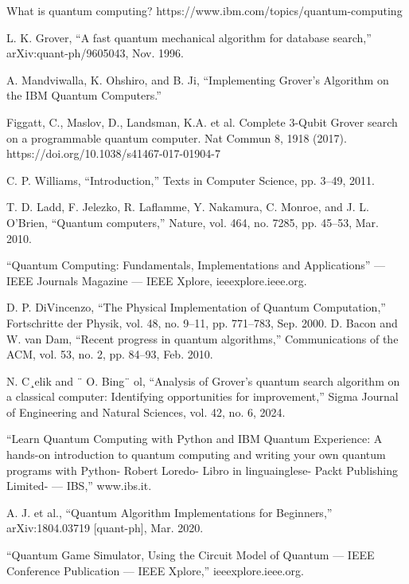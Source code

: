 \documentclass[conference]{IEEEtran}
\begin{document}
\begin{thebibliography}{00}
	 What is quantum computing?  https://www.ibm.com/topics/quantum-computing

	  L. K. Grover, “A fast quantum mechanical algorithm for database search,” arXiv:quant-ph/9605043, Nov. 1996.

	 A. Mandviwalla, K. Ohshiro, and B. Ji, “Implementing Grover’s Algorithm on the IBM Quantum Computers.”

	 Figgatt, C., Maslov, D., Landsman, K.A. et al. Complete 3-Qubit Grover search on a programmable quantum computer. Nat Commun 8, 1918 (2017). https://doi.org/10.1038/s41467-017-01904-7

	  C. P. Williams, “Introduction,” Texts in Computer Science, pp. 3–49,
	2011.

	  T. D. Ladd, F. Jelezko, R. Laflamme, Y. Nakamura, C. Monroe, and
	J. L. O’Brien, “Quantum computers,” Nature, vol. 464, no. 7285, pp.
	45–53, Mar. 2010.

	 “Quantum Computing: Fundamentals, Implementations and Applications” — IEEE Journals Magazine — IEEE Xplore, ieeexplore.ieee.org.

	 D. P. DiVincenzo, “The Physical Implementation of Quantum Computation,” Fortschritte der Physik, vol. 48, no. 9–11, pp. 771–783, Sep.
	2000.
	  D. Bacon and W. van Dam, “Recent progress in quantum algorithms,”
	Communications of the ACM, vol. 53, no. 2, pp. 84–93, Feb. 2010.

	  N. C¸elik and ¨ O. Bing¨ ol, “Analysis of Grover’s quantum search algorithm
	on a classical computer: Identifying opportunities for improvement,”
	Sigma Journal of Engineering and Natural Sciences, vol. 42, no. 6, 2024.

	 “Learn Quantum Computing with Python and IBM Quantum Experience: A hands-on introduction to quantum computing and writing your own quantum programs with Python- Robert Loredo- Libro in linguainglese- Packt Publishing Limited- — IBS,” www.ibs.it.



	 A. J. et al., “Quantum Algorithm Implementations for Beginners,” arXiv:1804.03719 [quant-ph], Mar. 2020.

	  “Quantum Game Simulator, Using the Circuit Model of Quantum — IEEE Conference Publication — IEEE Xplore,” ieeexplore.ieee.org.


\end{thebibliography}
\end{document}
